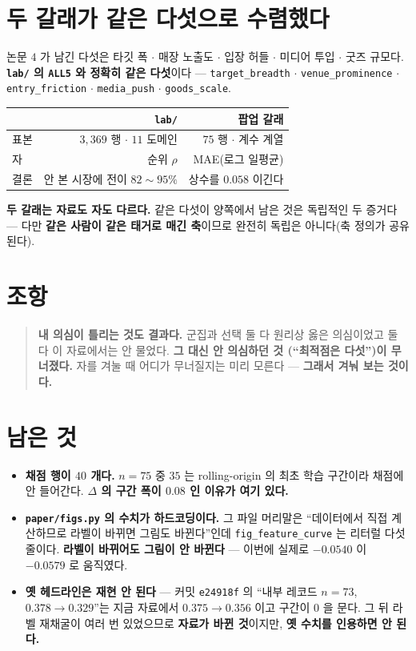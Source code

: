 \documentclass[11pt]{article}
\begin{document}
\section{두 갈래가 같은 다섯으로 수렴했다}

논문 $4$ 가 남긴 다섯은 타깃 폭 $\cdot$ 매장 노출도 $\cdot$ 입장 허들
$\cdot$ 미디어 투입 $\cdot$ 굿즈 규모다. \textbf{\texttt{lab/} 의
\texttt{ALL5} 와 정확히 같은 다섯}이다 --- \texttt{target\_breadth} $\cdot$
\texttt{venue\_prominence} $\cdot$ \texttt{entry\_friction} $\cdot$
\texttt{media\_push} $\cdot$ \texttt{goods\_scale}.

\begin{center}
\begin{tabular}{lrr}
\hline
 & \texttt{lab/} & 팝업 갈래 \\
\hline
표본 & $3{,}369$ 행 $\cdot$ $11$ 도메인 & $75$ 행 $\cdot$ 계수 계열 \\
자 & 순위 $\rho$ & MAE(로그 일평균) \\
결론 & 안 본 시장에 전이 $82\!\sim\!95\%$ & 상수를 $0.058$ 이긴다 \\
\hline
\end{tabular}
\end{center}

\textbf{두 갈래는 자료도 자도 다르다.} 같은 다섯이 양쪽에서 남은 것은
독립적인 두 증거다 --- 다만 \textbf{같은 사람이 같은 태거로 매긴 축}이므로
완전히 독립은 아니다(축 정의가 공유된다).

\section*{조항}

\begin{quote}
\textbf{내 의심이 틀리는 것도 결과다.} 군집과 선택 둘 다 원리상 옳은
의심이었고 둘 다 이 자료에서는 안 물었다. \textbf{그 대신 안 의심하던 것
(``최적점은 다섯'')이 무너졌다.} 자를 겨눌 때 어디가 무너질지는 미리
모른다 --- \textbf{그래서 겨눠 보는 것이다.}
\end{quote}

\section*{남은 것}

\begin{itemize}
\item \textbf{채점 행이 $40$ 개다.} $n{=}75$ 중 $35$ 는 rolling-origin
의 최초 학습 구간이라 채점에 안 들어간다. \textbf{$\Delta$ 의 구간 폭이
$0.08$ 인 이유가 여기 있다.}
\item \textbf{\texttt{paper/figs.py} 의 수치가 하드코딩이다.} 그 파일
머리말은 ``데이터에서 직접 계산하므로 라벨이 바뀌면 그림도 바뀐다''인데
\texttt{fig\_feature\_curve} 는 리터럴 다섯 줄이다. \textbf{라벨이 바뀌어도
그림이 안 바뀐다} --- 이번에 실제로 $-0.0540$ 이 $-0.0579$ 로 움직였다.
\item \textbf{옛 헤드라인은 재현 안 된다} --- 커밋 \texttt{e24918f} 의
``내부 레코드 $n{=}73$, $0.378\!\to\!0.329$''는 지금 자료에서
$0.375\!\to\!0.356$ 이고 구간이 $0$ 을 문다. 그 뒤 라벨 재채굴이 여러 번
있었으므로 \textbf{자료가 바뀐 것}이지만, \textbf{옛 수치를 인용하면 안
된다.}
\end{itemize}
\end{document}
